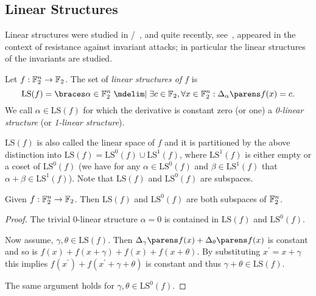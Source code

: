 \subsection{Linear Structures}
Linear structures were studied in \eg/~, and quite recently, see~\cite{C:BCLR17}, appeared in the context of resistance against invariant attacks; in particular the linear structures of the invariants are studied.
\begin{definition}
    Let $f : \mathbb{F}_2^n \to \mathbb{F}_2$.
    The set of \emph{linear structures of $f$} is
    \begin{equation*}
        \mathrm{LS}(f) = \set{\alpha \in \F_2^n \given \exists c \in \F_2, \forall x \in \F_2^n : \derive{\alpha}{f}(x) = c}.
    \end{equation*}
    We call $\alpha \in \mathrm{LS}(f)$ for which the derivative is constant zero (or one) a \emph{0-linear structure} (or \emph{1-linear structure}).
\end{definition}
$\mathrm{LS}(f)$ is also called the linear space of $f$ and it is partitioned by the above distinction into $\mathrm{LS}(f) = \mathrm{LS}^0(f) \cup \mathrm{LS}^1(f)$, where $\mathrm{LS}^1(f)$ is either empty or a coset of $\mathrm{LS}^0(f)$ (we have for any $\alpha \in \mathrm{LS}^0(f)$ and $\beta \in \mathrm{LS}^1(f)$ that $\alpha + \beta \in \mathrm{LS}^1(f)$).
Note that $\mathrm{LS}(f)$ and $\mathrm{LS}^0(f)$ are subspaces.
\begin{lemma}
    Given $f : \mathbb{F}_2^n \to \mathbb{F}_2$.
    Then $\mathrm{LS}(f)$ and $\mathrm{LS}^0(f)$ are both subspaces of $\mathbb{F}_2^n$.
\end{lemma}
\begin{proof}
    The trivial 0-linear structure $\alpha = 0$ is contained in $\mathrm{LS}(f)$ and $\mathrm{LS}^0(f)$.

    Now assume, $\gamma, \theta \in \mathrm{LS}(f)$.
    Then $\derive{\gamma}{f}(x) + \derive{\theta}{f}(x)$ is constant and so is $f(x) + f(x + \gamma) + f(x) + f(x + \theta)$.
    By substituting $x^\prime = x + \gamma$ this implies $f(x^\prime) + f(x^\prime + \gamma + \theta)$ is constant and thus $\gamma + \theta \in \mathrm{LS}(f)$.

    The same argument holds for $\gamma, \theta \in \mathrm{LS}^0(f)$.
\end{proof}

